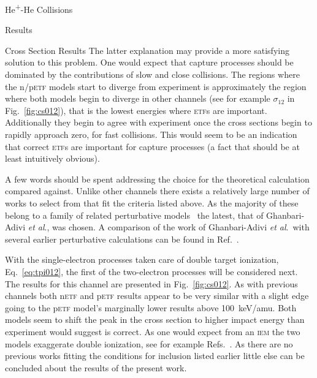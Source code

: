 \documentclass[a5paper, 9 pt]{extreport}
\begin{document}
\begin{chapter}{\texorpdfstring{He\textsuperscript{+}}{He+}-He Collisions \label{chap:hephe}}
\begin{section}{Results \label{sec:hephe-disc}}
\begin{subsection}{Cross Section Results \label{sec:hephe-res}}
         The latter explanation may provide a more satisfying solution to this problem. One would expect
         that capture processes should be dominated by the contributions of slow and close collisions.
         The regions where the n/p\textsc{etf} models start to diverge from experiment is approximately
         the region where both models begin to diverge in other channels (see for example $\sigma_{12}$
         in Fig.~\ref{fig:cs012}), that is the lowest energies where \textsc{etf}s are important.
         Additionally they begin to agree with experiment once the cross sections begin to rapidly
         approach zero, for fast collisions. This would seem to be an indication that correct
         \textsc{etf}s are important for capture processes (a fact that should be at least intuitively
         obvious).

         A few words should be spent addressing the choice for the theoretical calculation compared
         against. Unlike other channels there exists a relatively large number of works to select from
         that fit the criteria listed above. As the majority of these belong to a family of related
         perturbative models~\cite{Mancev96, BOC05, Mancev-07, MG-10, NTC11, GG-12b, GAG15} the latest,
         that of Ghanbari-Adivi \textit{et al}., was chosen. A comparison of the work of Ghanbari-Adivi
         \textit{et al}.\ with several earlier perturbative calculations can be found in
         Ref.~\cite{GAG15}.

         With the single-electron processes taken care of double target ionization,
         Eq.~\eqref{eq:tpi012}, the first of the two-electron processes will be considered next. The
         results for this channel are presented in Fig.~\ref{fig:cs012}. As with previous channels both
         n\textsc{etf} and p\textsc{etf} results appear to be very similar with a slight edge going to
         the p\textsc{etf} model's marginally lower results above 100~keV/amu. Both models seem to shift
         the peak in the cross section to higher impact energy than experiment would suggest is correct.
         As one would expect from an \textsc{iem} the two models exaggerate double ionization, see for
         example Refs.~\cite{pbarhe-rev, p-he2p-he}. As there are no previous works fitting the
         conditions for inclusion listed earlier little else can be concluded about the results of the
         present work.


\end{subsection}
\end{section}
\end{chapter}
\end{document}
